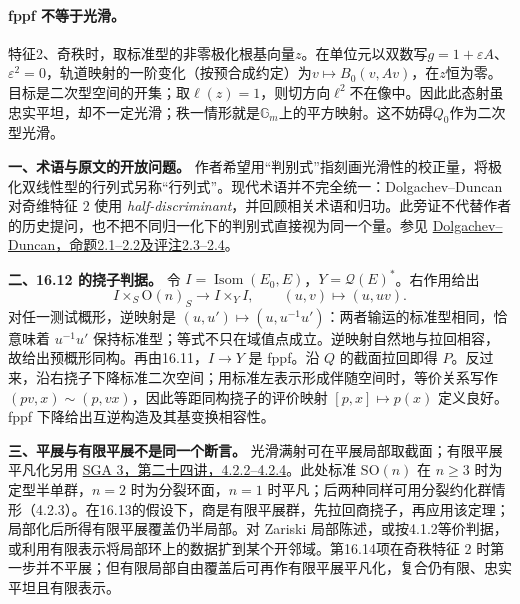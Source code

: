 \paragraph{fppf 不等于光滑。}
特征2、奇秩时，取标准型的非零极化根基向量$z$。在单位元以双数写$g=1+\varepsilon A$、$\varepsilon^2=0$，轨道映射的一阶变化（按预合成约定）为$v\mapsto B_0(v,Av)$，在$z$恒为零。目标是二次型空间的开集；取$\ell(z)=1$，则切方向$\ell^2$不在像中。因此此态射虽忠实平坦，却不一定光滑；秩一情形就是$\mathbb G_m$上的平方映射。这不妨碍$Q_0$作为二次型光滑。
\par\endgroup

\begingroup
\def\OO{\mathcal O}
\def\Qsp{\mathcal Q}
\def\Sym{\operatorname{Sym}}
\def\Isom{\operatorname{Isom}}
\def\Spec{\operatorname{Spec}}
\hypertarget{audit:L18-072}{}
\noindent\textbf{一、术语与原文的开放问题。}
作者希望用“判别式”指刻画光滑性的校正量，将极化双线性型的行列式另称“行列式”。现代术语并不完全统一：Dolgachev--Duncan 对奇维特征 $2$ 使用 \emph{half-discriminant}，并回顾相关术语和归功。此旁证不代替作者的历史提问，也不把不同归一化下的判别式直接视为同一个量。参见 \href{https://doi.org/10.2140/ant.2018.12.99}{Dolgachev--Duncan，命题2.1--2.2及评注2.3--2.4}。

\medskip
\noindent\textbf{二、16.12 的挠子判据。}
令 $I=\Isom(E_0,E)$，$Y=\Qsp(E)^*$。右作用给出
\[
 I\times_S \mathrm O(n)_S\longrightarrow I\times_Y I,
 \qquad (u,v)\longmapsto(u,uv).
\]
对任一测试概形，逆映射是 $(u,u')\mapsto(u,u^{-1}u')$：两者输运的标准型相同，恰意味着 $u^{-1}u'$ 保持标准型；等式不只在域值点成立。逆映射自然地与拉回相容，故给出预概形同构。再由16.11，$I\to Y$ 是 fppf。沿 $Q$ 的截面拉回即得 $P$。反过来，沿右挠子下降标准二次空间；用标准左表示形成伴随空间时，等价关系写作 $(pv,x)\sim(p,vx)$，因此等距同构挠子的评价映射 $[p,x]\mapsto p(x)$ 定义良好。fppf 下降给出互逆构造及其基变换相容性。

\medskip

\noindent\textbf{三、平展与有限平展不是同一个断言。}
光滑满射可在平展局部取截面；有限平展平凡化另用 \href{https://grothendiecksga.com/read/sga3/fr/XXIV-4.html}{SGA 3，第二十四讲，4.2.2--4.2.4}。此处标准 $\mathrm{SO}(n)$ 在 $n\ge3$ 时为定型半单群，$n=2$ 时为分裂环面，$n=1$ 时平凡；后两种同样可用分裂约化群情形（4.2.3）。在16.13的假设下，商是有限平展群，先拉回商挠子，再应用该定理；局部化后所得有限平展覆盖仍半局部。对 Zariski 局部陈述，或按4.1.2等价判据，或利用有限表示将局部环上的数据扩到某个开邻域。第16.14项在奇秩特征 $2$ 时第一步并不平展；但有限局部自由覆盖后可再作有限平展平凡化，复合仍有限、忠实平坦且有限表示。

